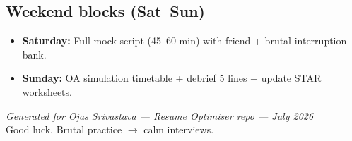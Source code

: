 \documentclass[9pt,a4paper]{article}
\begin{document}
\subsection{Weekend blocks (Sat--Sun)}
\begin{itemize}
  \item \textbf{Saturday:} Full mock script (45--60 min) with friend + brutal interruption bank.
  \item \textbf{Sunday:} OA simulation timetable + debrief 5 lines + update STAR worksheets.
\end{itemize}

\vfill
\begin{center}
\textit{Generated for Ojas Srivastava --- Resume Optimiser repo --- July 2026}\\
\small Good luck. Brutal practice $\rightarrow$ calm interviews.
\end{center}
\end{document}
